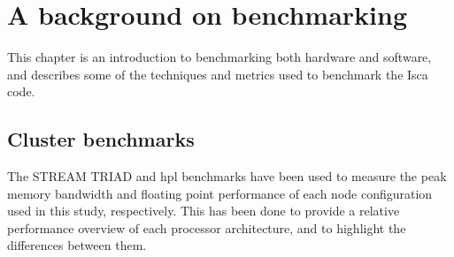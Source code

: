 \documentclass[a4paper,11pt]{report}
\begin{document}
\chapter{A background on benchmarking}
This chapter is an introduction to benchmarking both hardware and software, and describes some of the techniques and metrics used to benchmark the Isca code. 
\section{Cluster benchmarks}
The STREAM TRIAD and \gls{hpl} benchmarks have been used to measure the peak memory bandwidth and floating point performance of each node configuration used in this study, respectively. This has been done to provide a relative performance overview of each processor architecture, and to highlight the differences between them. 
\end{document}

